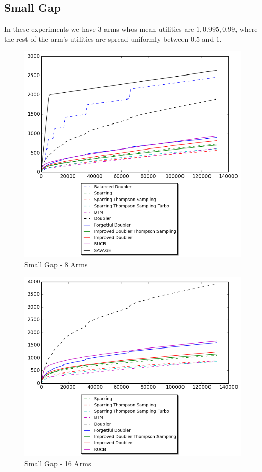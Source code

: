 \documentclass[MSc,beforeExam]{iitcsthesis}
\begin{document}
\subsection{Small Gap}
In these experiments we have 3 arms whos mean utilities are $1, 0.995, 0.99$, where the rest of the arm's utilities are spread uniformly between $0.5$ and $1$. 
\begin{figure}[h!]
\centering
  \includegraphics[scale=0.8]{graphs/close_arm_8.png}
  \caption{Small Gap - 8 Arms}
\end{figure}
\newpage
\begin{figure}[h!]
\centering
  \includegraphics[scale=0.8]{graphs/close_arm_16.png}
  \caption{Small Gap - 16 Arms}
\end{figure}
\end{document}
